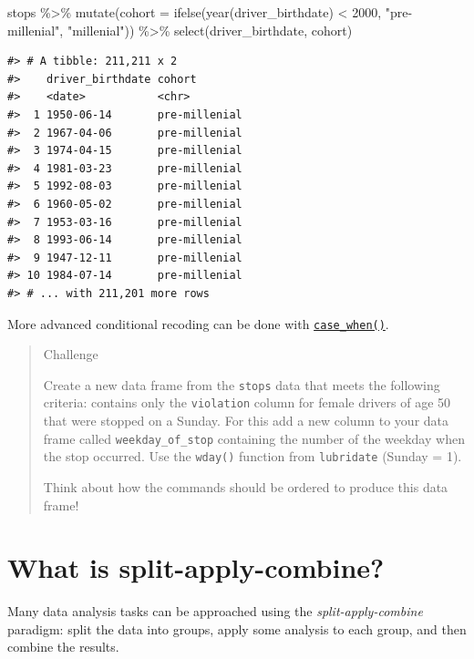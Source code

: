 \documentclass[
]{book}
\newenvironment{Shaded}{\begin{snugshade}}{\end{snugshade}}
\newcommand{\AttributeTok}[1]{\textcolor[rgb]{0.77,0.63,0.00}{#1}}
\newcommand{\DecValTok}[1]{\textcolor[rgb]{0.00,0.00,0.81}{#1}}
\newcommand{\FunctionTok}[1]{\textcolor[rgb]{0.00,0.00,0.00}{#1}}
\newcommand{\NormalTok}[1]{#1}
\newcommand{\SpecialCharTok}[1]{\textcolor[rgb]{0.00,0.00,0.00}{#1}}
\newcommand{\StringTok}[1]{\textcolor[rgb]{0.31,0.60,0.02}{#1}}
\begin{document}
\begin{Shaded}
\begin{Highlighting}[]
\NormalTok{stops }\SpecialCharTok{\%\textgreater{}\%} 
  \FunctionTok{mutate}\NormalTok{(}\AttributeTok{cohort =} \FunctionTok{ifelse}\NormalTok{(}\FunctionTok{year}\NormalTok{(driver\_birthdate) }\SpecialCharTok{\textless{}} \DecValTok{2000}\NormalTok{, }\StringTok{"pre{-}millenial"}\NormalTok{, }\StringTok{"millenial"}\NormalTok{)) }\SpecialCharTok{\%\textgreater{}\%} 
  \FunctionTok{select}\NormalTok{(driver\_birthdate, cohort)}
\end{Highlighting}
\end{Shaded}

\begin{verbatim}
#> # A tibble: 211,211 x 2
#>    driver_birthdate cohort       
#>    <date>           <chr>        
#>  1 1950-06-14       pre-millenial
#>  2 1967-04-06       pre-millenial
#>  3 1974-04-15       pre-millenial
#>  4 1981-03-23       pre-millenial
#>  5 1992-08-03       pre-millenial
#>  6 1960-05-02       pre-millenial
#>  7 1953-03-16       pre-millenial
#>  8 1993-06-14       pre-millenial
#>  9 1947-12-11       pre-millenial
#> 10 1984-07-14       pre-millenial
#> # ... with 211,201 more rows
\end{verbatim}

More advanced conditional recoding can be done with \href{https://dplyr.tidyverse.org/reference/case_when.html}{\texttt{case\_when()}}.

\begin{quote}
Challenge

Create a new data frame from the \texttt{stops} data that meets the following
criteria: contains only the \texttt{violation} column for female drivers of age 50 that were stopped on a Sunday. For this add a new column to your data frame called
\texttt{weekday\_of\_stop} containing the number of the weekday when the stop occurred. Use the \texttt{wday()} function from \texttt{lubridate} (Sunday = 1).

Think about how the commands should be ordered to produce this data frame!
\end{quote}

\hypertarget{what-is-split-apply-combine}{%
\section{What is split-apply-combine?}\label{what-is-split-apply-combine}}

Many data analysis tasks can be approached using the \emph{split-apply-combine}
paradigm: split the data into groups, apply some analysis to each group, and
then combine the results.
\end{document}
